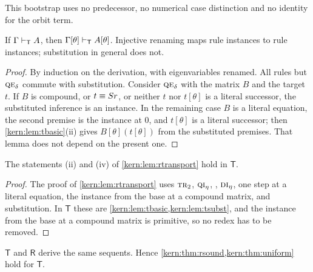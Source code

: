 This bootstrap uses no predecessor, no numerical case distinction and no
identity for the orbit term.

\begin{lemma}
\label{kern:lem:tsubst}
If $\Gamma\vdash_{\mathsf{T}}A$, then
$\Gamma[\theta]\vdash_{\mathsf{T}}A[\theta]$.  Injective renaming maps rule
instances to rule instances; substitution in general does not.
\end{lemma}

\begin{proof}
By induction on the derivation, with eigenvariables renamed.  All rules but
$\rulename{QE}_{\delta}$ commute with substitution.  Consider
$\rulename{QE}_{\delta}$ with the matrix $B$ and the target $t$.  If $B$ is
compound, or $t\equiv S r$, or neither $t$ nor $t[\theta]$ is a literal
successor, the substituted inference is an instance.  In the remaining case
$B$ is a literal equation, the second premise is the instance at $0$, and
$t[\theta]$ is a literal successor; then \cref{kern:lem:tbasic}(ii) gives
$B[\theta](t[\theta])$ from the substituted premises.  That lemma does not
depend on the present one.
\end{proof}

\begin{lemma}
\label{kern:lem:ttransport}
The statements (ii) and (iv) of \cref{kern:lem:rtransport} hold in
$\mathsf{T}$.
\end{lemma}

\begin{proof}
The proof of \cref{kern:lem:rtransport} uses $\rulename{Tr}_{2}$,
$\rulename{QI}_{\eta}$, , $\rulename{DI}_{\eta}$, one step at a
literal equation, the instance from the base at a compound matrix, and
substitution.  In $\mathsf{T}$ these are \cref{kern:lem:tbasic,kern:lem:tsubst},
and the instance from the base at a compound matrix is primitive, so no
redex has to be removed.
\end{proof}

\begin{theorem}
\label{kern:thm:target}
$\mathsf{T}$ and $\mathsf{R}$ derive the same sequents.  Hence
\cref{kern:thm:rsound,kern:thm:uniform} hold for $\mathsf{T}$.
\end{theorem}

